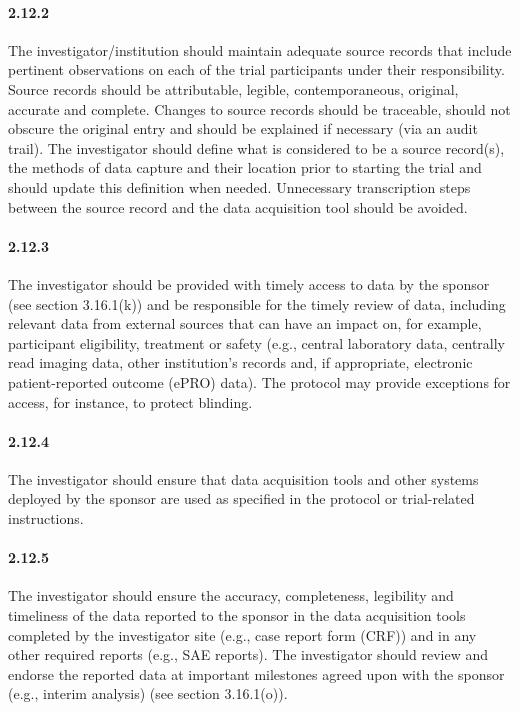 \documentclass[11pt]{article}
\begin{document}
\paragraph{2.12.2} The investigator/institution should maintain adequate source records that include pertinent observations on each of the trial participants under their responsibility. Source records should be attributable, legible, contemporaneous, original, accurate and complete. Changes to source records should be traceable, should not obscure the original entry and should be explained if necessary (via an audit trail). The investigator should define what is considered to be a source record(s), the methods of data capture and their location prior to starting the trial and should update this definition when needed. Unnecessary transcription steps between the source record and the data acquisition tool should be avoided.

\paragraph{2.12.3} The investigator should be provided with timely access to data by the sponsor (see section 3.16.1(k)) and be responsible for the timely review of data, including relevant data from external sources that can have an impact on, for example, participant eligibility, treatment or safety (e.g., central laboratory data, centrally read imaging data, other institution's records and, if appropriate, electronic patient-reported outcome (ePRO) data). The protocol may provide exceptions for access, for instance, to protect blinding.

\paragraph{2.12.4} The investigator should ensure that data acquisition tools and other systems deployed by the sponsor are used as specified in the protocol or trial-related instructions.

\paragraph{2.12.5} The investigator should ensure the accuracy, completeness, legibility and timeliness of the data reported to the sponsor in the data acquisition tools completed by the investigator site (e.g., case report form (CRF)) and in any other required reports (e.g., SAE reports). The investigator should review and endorse the reported data at important milestones agreed upon with the sponsor (e.g., interim analysis) (see section 3.16.1(o)).
\end{document}
